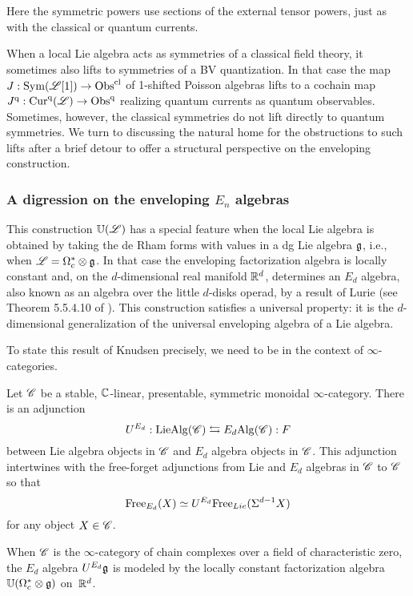Here the symmetric powers use sections of the external tensor powers, just as with the classical or quantum currents.

When a local Lie algebra acts as symmetries of a classical field theory,
it sometimes also lifts to symmetries of a BV quantization.
In that case the map $J: {\rm Sym}(\mathscr L[1]) \to {\rm Obs}^{\rm cl}$ of 1-shifted Poisson algebras lifts to a cochain map $J^{\rm q}: {\rm Cur}^{\rm q}(\mathscr L) \to {\rm Obs}^{\rm q}$ realizing quantum currents as quantum observables.
Sometimes, however, the classical symmetries do not lift directly to quantum symmetries.
We turn to discussing the natural home for the obstructions to such lifts after a brief detour to offer a structural perspective on the enveloping construction.

\subsubsection{A digression on the enveloping $E_n$ algebras}
\label{sec:knudsen}

This construction $\mathbb U(\mathscr L)$ has a special feature when the local Lie algebra is obtained by taking the de Rham forms with values in a dg Lie algebra $\mathfrak g$, i.e., when $\mathscr L = \Omega^*_c \otimes \mathfrak g$.
In that case the enveloping factorization algebra is locally constant and, on the $d$-dimensional real manifold $\mathbb R^d$, determines an $E_d$ algebra, also known as an algebra over the little $d$-disks operad, by a result of Lurie (see Theorem 5.5.4.10 of \cite{LurieHA}).
This construction satisfies a universal property: 
it is the $d$-dimensional generalization of the universal enveloping algebra of a Lie algebra.

To state this result of Knudsen precisely, we need to be in the context of $\infty$-categories.

\begin{thm} 
\label{thm:knudsen}
Let $\mathscr C$ be a stable, $\mathbb C$-linear, presentable, symmetric monoidal $\infty$-category.
There is an adjunction
\[
U^{E_d} : {\rm LieAlg}(\mathscr C) \leftrightarrows E_d{\rm Alg} (\mathscr C): F
\]
between Lie algebra objects in $\mathscr C$ and $E_d$ algebra objects in $\mathscr C$.
This adjunction intertwines with the free-forget adjunctions from Lie and $E_d$ algebras in $\mathscr C$ to $\mathscr C$ 
so that 
\[
{\rm Free}_{E_d}(X) \simeq U^{E_d} {\rm Free}_{Lie}(\Sigma^{d-1} X)
\]
for any object $X \in \mathscr C$. 

When $\mathscr C$ is the $\infty$-category of chain complexes over a field of characteristic zero,
the $E_d$ algebra $U^{E_d} \mathfrak g$ is modeled by the locally constant factorization algebra $\mathbb U(\Omega^*_c \otimes \mathfrak g)$ on~$\mathbb R^d$.
\end{thm}

